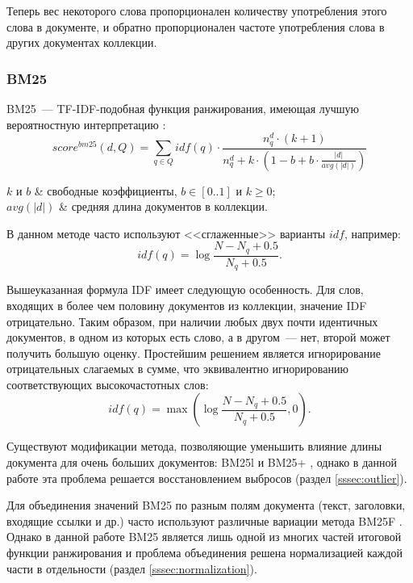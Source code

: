 Теперь вес некоторого слова пропорционален количеству употребления этого слова в документе, и обратно пропорционален частоте употребления слова в других документах коллекции.


\subsubsection{BM25} \label{sssec:bm25}
BM25~--- TF-IDF-подобная функция ранжирования, имеющая лучшую вероятностную интерпретацию \cite{robertson09}:
\begin{equation} \label{eq:bm25}
  score^{bm25}(d, Q) = \sum_{q\in Q}idf(q)\cdot\frac{n_q^d\cdot (k+1)}{n_q^d + k\cdot\left(1-b+b\cdot\frac{|d|}{avg(|d|)}\right)}
\end{equation}
\begin{conditions}
  $k$ и $b$ & свободные коэффициенты, $b\in[0..1]$ и $k \geq 0$;\\
  $avg(|d|)$ & средняя длина документов в коллекции.
\end{conditions}

В данном методе часто используют <<сглаженные>> варианты $idf$, например:
\begin{equation}
  idf(q)=\log\frac{N - N_q + 0.5}{N_q + 0.5}.
\end{equation}

Вышеуказанная формула IDF имеет следующую особенность. Для слов, входящих в более чем половину документов из коллекции, значение IDF отрицательно. Таким образом, при наличии любых двух почти идентичных документов, в одном из которых есть слово, а в другом~--- нет, второй может получить большую оценку. Простейшим решением является игнорирование отрицательных слагаемых в сумме, что эквивалентно игнорированию соответствующих высокочастотных слов:
\begin{equation}
  idf(q)=\max\left(\log\frac{N - N_q + 0.5}{N_q + 0.5}, 0\right).
\end{equation}

Существуют модификации метода, позволяющие уменьшить влияние длины документа для очень больших документов: BM25l \cite{lv11+} и BM25+ \cite{lv11l}, однако в данной работе эта проблема решается восстановлением выбросов (раздел \ref{sssec:outlier}).

Для объединения значений BM25 по разным полям документа (текст, заголовки, входящие ссылки и др.) часто используют различные вариации метода BM25F \cite{robertson09}. Однако в данной работе BM25 является лишь одной из многих частей итоговой функции ранжирования и проблема объединения решена нормализацией каждой части в отдельности (раздел \ref{sssec:normalization}).



